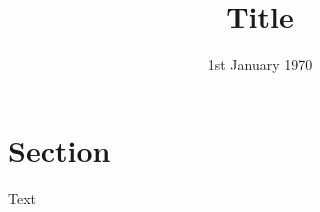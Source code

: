 \documentclass{article}
\title{Title}
\date{\vspace{-1.0cm}1st January 1970}
\begin{document}
\maketitle

\section*{Section}

Text
\end{document}
